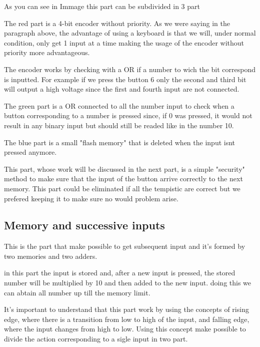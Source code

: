 \documentclass{article}
\begin{document}
As you can see in Immage %
this part can be subdivided in 3 part

\vspace{3mm}

The red part is a 4-bit encoder without priority. As we were saying in the paragraph above, the advantage of using a keyboard is that we will, under normal condition, %
 only get 1 input at a time making the usage of the encoder without priority more advantageous. 

The encoder works by checking with a OR if a number to wich the bit correspond is inputted. 
For example if we press the button 6 only the second and third bit will output a high voltage since the first and fourth input are not connected.

\vspace{3mm}

The green part is a OR connected to all the number input to check when a button corresponding to a number is pressed since, if 0 was pressed, it would not result in any binary input but should still be readed like in the number 10. 

\vspace{3mm}

The blue part is a small "flash memory" that is deleted when the input isnt pressed anymore. 

This part, whose work will be discussed in the next part, is a simple "security" method to make sure that the input of the button arrive correctly to the next memory. 
This part could be eliminated if all the tempistic are correct but we prefered keeping it to make sure no would problem arise.



\subsection{Memory and successive inputs}

This is the part that make possible to get subsequent input and it's formed by two memories and two adders. 

in this part the input is stored and, after a new input is pressed, the stored number will be multiplied by 10 and then added to the new input. doing this we can abtain all number up till the memory limit.

It's important to understand that this part work by using the concepts of rising edge, where there is a transition from low to high of the input, and falling edge, where the input changes from high to low. Using this concept make possible to divide the action corresponding to a sigle input in two part.
\end{document}
